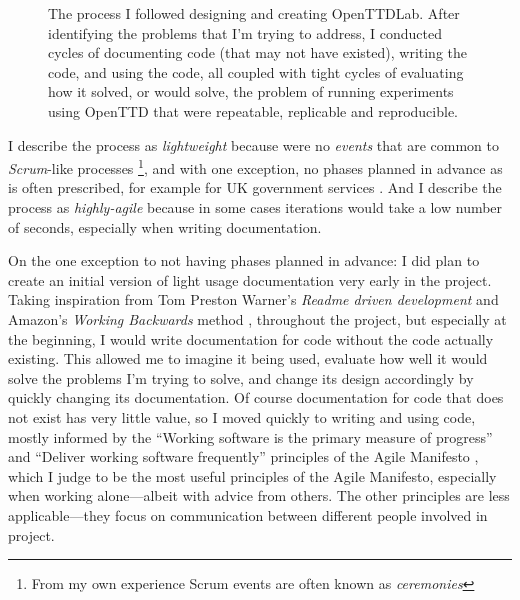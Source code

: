 \documentclass[logo,msc,dsti]{style/infthesis}    %
\begin{document}
{\begin{figure}[ht]
\caption{The process I followed designing and creating OpenTTDLab. After identifying the problems that I'm trying to address, I conducted cycles of documenting code (that may not have existed), writing the code, and using the code, all coupled with tight cycles of evaluating how it solved, or would solve, the problem of running experiments using OpenTTD that were repeatable, replicable and reproducible.}
\label{fig:solo-agile}
\end{figure}
%
I describe the process as \emph{lightweight} because were no \emph{events} that are common to \emph{Scrum}-like processes \cite{SCRUM}\footnote{From my own experience Scrum events are often known as \emph{ceremonies}}, and with one exception, no phases planned in advance as is often prescribed, for example for UK government services \cite{GOVUKAgile}. And I describe the process as \emph{highly-agile} because in some cases iterations would take a low number of seconds, especially when writing documentation.

On the one exception to not having phases planned in advance: I did plan to create an initial version of light usage documentation very early in the project. Taking inspiration from Tom Preston Warner's \emph{Readme driven development} \cite{ReadmeDrivenDevelopment} and Amazon's \emph{Working Backwards} method \cite{bryar2021working}, throughout the project, but especially at the beginning, I would write documentation for code without the code actually existing. This allowed me to imagine it being used, evaluate how well it would solve the problems I'm trying to solve, and change its design accordingly by quickly changing its documentation. Of course documentation for code that does not exist has very little value, so I moved quickly to writing and using code, mostly informed by the ``Working software is the primary measure of progress'' and ``Deliver working software frequently'' principles of the Agile Manifesto \cite{beck2001manifesto}, which I judge to be the most useful principles of the Agile Manifesto, especially when working alone---albeit with advice from others. The other principles are less applicable---they focus on communication between different people involved in project.

}
\end{document}
